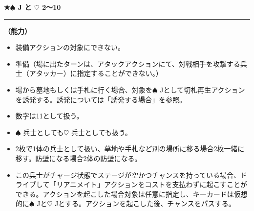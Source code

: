 \documentclass[twocolumn,a5paper,papersize,10pt]{jarticle}
\begin{document}
 
\vspace{2mm}
\begin{tcolorbox}[title={\small\bf【Character】リアニメーター}{\scriptsize （兵士）}]

  {\scriptsize\bf ★{\normalsize $\spadesuit$} J と {\normalsize $\heartsuit$} 2〜10}

\vspace{1mm} %
\hrule height 0.1mm depth 0mm width 62mm %
\vspace{1mm} %

{\bf（能力）}


\vspace{-1zh}%
\begin{itemize}
\setlength{\leftskip}{-0.3cm}
\setlength{\parskip}{0pt} %

\item 装備アクションの対象にできない。

\item 準備（場に出たターンは、アタックアクションにて、対戦相手を攻撃する兵士（アタッカー）に指定することができない。）

\item 場から墓地もしくは手札に行く場合、対象を{\normalsize $\spadesuit$} Jとして切札再生アクションを誘発する。誘発については「誘発する場合」を参照。

\item 数字は11として扱う。

\item {\normalsize $\spadesuit$} 兵士としても{\normalsize $\heartsuit$} 兵士としても扱う。

\item 2枚で1体の兵士として扱い、墓地や手札など別の場所に移る場合2枚一緒に移す。防壁になる場合2体の防壁になる。

\item この兵士がチャージ状態でステージが空かつチャンスを持っている場合、ドライブして「リアニメイト」アクションをコストを支払わずに起こすことができる。アクションを起こした場合対象は任意に指定し、キーカードは仮想的に{\normalsize $\spadesuit$} Jと{\normalsize $\heartsuit$} Jとする。アクションを起こした後、チャンスをパスする。
\vspace{-1zh}%
\end{itemize}

\vspace{1mm} %
\end{tcolorbox}
\end{document}
